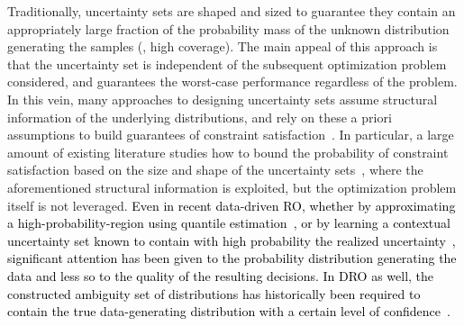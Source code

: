 \documentclass[11pt]{article}
\newcommand{\bsnote}[1]{\noindent\textcolor{red}{\texttt{Bartolomeo: #1}}}
\newcommand{\inote}[1]{\noindent\textcolor{orange}{\texttt{Irina: #1}}}
\newcommand{\RC}[1]{\textcolor{black}{#1}}
\begin{document}
Traditionally, uncertainty sets are shaped and sized to guarantee they contain an appropriately large fraction of the probability mass of the unknown distribution generating the samples (\ie, high coverage). The main appeal of this approach is that the uncertainty set is independent of the subsequent optimization problem considered, and guarantees the worst-case performance regardless of the problem.
In this vein, many approaches to designing uncertainty sets assume structural information of the underlying distributions, and rely on these a priori assumptions to build guarantees of constraint satisfaction~\citep{ben-tal_robust_2000,bertsimassurvey,bandi_tractable_2012}.
In particular, a large amount of existing literature studies how to bound the probability of constraint satisfaction based on the size and shape of the uncertainty sets~\citep{guarantees_2012, guarantees1}, where the aforementioned structural information is exploited, but the optimization problem itself is not leveraged.
\RC{Even in recent data-driven \gls{RO}, whether by approximating a high-probability-region using quantile estimation~\citep{hong2022ms}, or by learning a contextual uncertainty set known to contain with high probability the realized uncertainty~\citep{knn}, significant attention has been given to the probability distribution generating the data and less so to the quality of the resulting decisions.
In \gls{DRO} as well, the constructed ambiguity set of distributions has historically been required to contain the true data-generating distribution with a certain level of confidence~\citep{mohajerin_esfahani_data-driven_2018}.}
\end{document}
